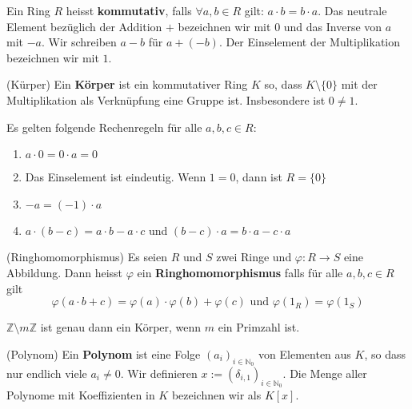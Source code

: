 \documentclass[../Algebra_script.tex]{subfiles}
\begin{document}
\begin{remark}
	Ein Ring $R$ heisst \textbf{kommutativ}, falls $\forall a, b \in R$ gilt: $a \cdot b = b \cdot a$. Das neutrale Element bezüglich der Addition $+$ bezeichnen wir mit $0$ und das Inverse von $a$ mit $-a$. Wir schreiben $a - b$ für $a + (-b)$. Der Einselement der Multiplikation bezeichnen wir mit $1$. 
\end{remark}

\begin{definition}{(Kürper)}
	Ein \textbf{Körper} ist ein kommutativer Ring $K$ so, dass $K \setminus \{0\}$ mit der Multiplikation als Verknüpfung eine Gruppe ist. Insbesondere ist $0 \neq 1$.
\end{definition}

\begin{remark}
	Es gelten folgende Rechenregeln für alle $a, b, c \in R$:
	\begin{enumerate}
		\item $a \cdot 0 = 0 \cdot a = 0$
		\item Das Einselement ist eindeutig. Wenn $1 = 0$, dann ist $R = \{0\}$
		\item $-a = (-1)\cdot a$
		\item $a \cdot (b - c) = a\cdot b - a\cdot c$ und $(b - c) \cdot a = b \cdot a - c \cdot a$
	\end{enumerate}
\end{remark}

\begin{definition}{(Ringhomomorphismus)}
	Es seien $R$ und $S$ zwei Ringe und $\varphi : R \to S$ eine Abbildung. Dann heisst $\varphi$ ein \textbf{Ringhomomorphismus} falls für alle $a, b, c \in R$ gilt
	\[\varphi(a \cdot b + c) = \varphi(a)\cdot \varphi(b) + \varphi(c) \text{ und } \varphi(1_R) = \varphi(1_S)\]
\end{definition}

\begin{proposition}
	$\mathbb{Z} \setminus m\mathbb{Z}$ ist genau dann ein Körper, wenn $m$ ein Primzahl ist.
\end{proposition}	

\begin{definition}{(Polynom)}
	Ein \textbf{Polynom} ist eine Folge $(a_i)_{i \in \mathbb{N}_0}$ von Elementen aus $K$, so dass nur endlich viele $a_i \neq 0$. Wir definieren $x := (\delta_{i, 1})_{i \in \mathbb{N}_0}$. Die Menge aller Polynome mit Koeffizienten in $K$ bezeichnen wir als $K[x]$.
\end{definition} 
\end{document}
